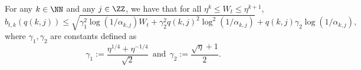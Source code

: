     \begin{lemma}\label{lemma:btkj-upper-bound}
      For any $k \in \NN$ and any $j \in \ZZ$, we have that for all $\eta^k \leq W_t \leq \eta^{k+1}$, 
      \begin{equation}
        b_{t,k}(q(k,j)) \leq \sqrt{\gamma_1^2 \log(1/\alpha_{k,j}) W_t + \gamma_2^2 q(k,j)^2 \log^2(1/\alpha_{k,j})} + q(k,j)\gamma_2 \log(1/\alpha_{k,j}),\label{eq:btkj-upper-bound-gammas}
      \end{equation}
      where $\gamma_1, \gamma_2$ are constants defined as
      \begin{equation}\label{eq:gammas}
        \gamma_1 := \frac{\eta^{1/4} + \eta^{-1/4}}{\sqrt{2}}~~\text{and}~~ \gamma_2 := \frac{\sqrt{\eta} + 1}{2}.
      \end{equation}
    \end{lemma}
